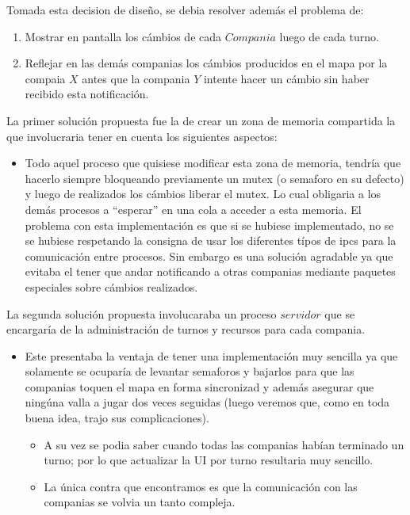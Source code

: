 \documentclass[a4paper,12pt,spanish]{article} %
\begin{document}
Tomada esta decision de diseño, se debia resolver además el problema
de:
\begin{enumerate}
\item Mostrar en pantalla los cámbios de cada $Compania$ luego de cada
turno.
\item Reflejar en las demás companias los cámbios producidos en el mapa
por la compaia $X$ antes que la compania $Y$ intente hacer un cámbio
sin haber recibido esta notificación.\\

\end{enumerate}
La primer solución propuesta fue la de crear un zona de memoria compartida
la que involucraria tener en cuenta los siguientes aspectos:
\begin{itemize}
\item Todo aquel proceso que quisiese modificar esta zona de memoria, tendría
que hacerlo siempre bloqueando previamente un mutex (o semaforo en
su defecto) y luego de realizados los cámbios liberar el mutex. Lo
cual obligaria a los demás procesos a {}``esperar'' en una cola
a acceder a esta memoria. El problema con esta implementación es que
si se hubiese implementado, no se se hubiese respetando la consigna
de usar los diferentes típos de ipcs para la comunicación entre procesos.
Sin embargo es una solución agradable ya que evitaba el tener que
andar notificando a otras companias mediante paquetes especiales sobre
cámbios realizados.
\end{itemize}
La segunda solución propuesta involucaraba un proceso $servidor$
que se encargaría de la administración de turnos y recursos para cada
compania.
\begin{itemize}
\item Este presentaba la ventaja de tener una implementación muy sencilla
ya que solamente se ocuparía de levantar semaforos y bajarlos para
que las companias toquen el mapa en forma sincronizad y además asegurar
que ningúna valla a jugar dos veces seguidas (luego veremos que, como
en toda buena idea, trajo sus complicaciones).

\begin{itemize}
\item A su vez se podia saber cuando todas las companias habían terminado
un turno; por lo que actualizar la UI por turno resultaria muy sencillo.
\item La única contra que encontramos es que la comunicación con las companias
se volvia un tanto compleja.
\end{itemize}
\end{itemize}
\end{document}
